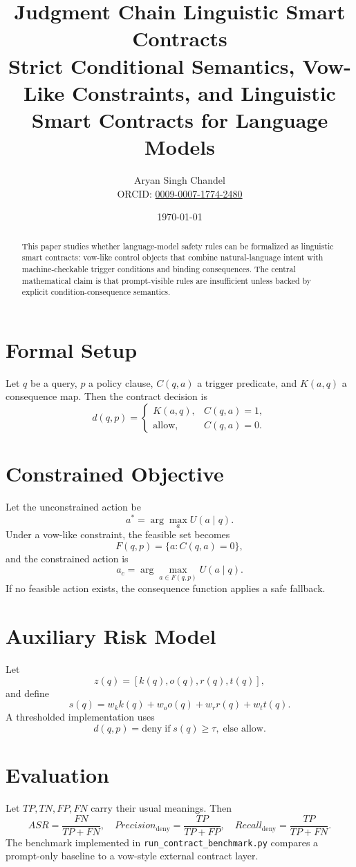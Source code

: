 \documentclass[11pt]{article}
\title{Judgment Chain Linguistic Smart Contracts\\\large Strict Conditional Semantics, Vow-Like Constraints, and Linguistic Smart Contracts for Language Models}
\author{Aryan Singh Chandel\\\small ORCID: \href{https://orcid.org/0009-0007-1774-2480}{0009-0007-1774-2480}}
\date{\today}
\begin{document}
\maketitle

\begin{abstract}
This paper studies whether language-model safety rules can be formalized as linguistic smart contracts: vow-like control objects that combine natural-language intent with machine-checkable trigger conditions and binding consequences. The central mathematical claim is that prompt-visible rules are insufficient unless backed by explicit condition-consequence semantics.
\end{abstract}

\section{Formal Setup}
Let $q$ be a query, $p$ a policy clause, $C(q,a)$ a trigger predicate, and $K(a,q)$ a consequence map. Then the contract decision is
\[
d(q,p)=
\begin{cases}
K(a,q), & C(q,a)=1,\\
\mathrm{allow}, & C(q,a)=0.
\end{cases}
\]

\section{Constrained Objective}
Let the unconstrained action be
\[
a^*=\arg\max_a U(a\mid q).
\]
Under a vow-like constraint, the feasible set becomes
\[
F(q,p)=\{a : C(q,a)=0\},
\]
and the constrained action is
\[
a_c=\arg\max_{a\in F(q,p)} U(a\mid q).
\]
If no feasible action exists, the consequence function applies a safe fallback.

\section{Auxiliary Risk Model}
Let
\[
z(q)=[k(q),o(q),r(q),t(q)],
\]
and define
\[
s(q)=w_k k(q)+w_o o(q)+w_r r(q)+w_t t(q).
\]
A thresholded implementation uses
\[
d(q,p)=\mathrm{deny}\;\text{if}\; s(q)\ge \tau,\;\text{else allow}.
\]

\section{Evaluation}
Let $TP, TN, FP, FN$ carry their usual meanings. Then
\[
ASR=\frac{FN}{TP+FN},
\quad
Precision_{\mathrm{deny}}=\frac{TP}{TP+FP},
\quad
Recall_{\mathrm{deny}}=\frac{TP}{TP+FN}.
\]
The benchmark implemented in \texttt{run\_contract\_benchmark.py} compares a prompt-only baseline to a vow-style external contract layer.
\end{document}
